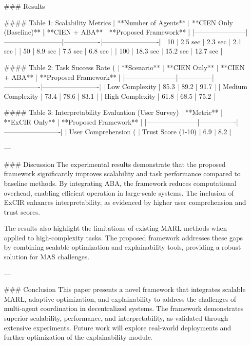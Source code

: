 ### Results  

#### Table 1: Scalability Metrics  
| **Number of Agents** | **CIEN Only (Baseline)** | **CIEN + ABA** | **Proposed Framework** |  
|-----------------------|--------------------------|----------------|-------------------------|  
| 10                   | 2.5 sec                 | 2.3 sec        | 2.1 sec                |  
| 50                   | 8.9 sec                 | 7.5 sec        | 6.8 sec                |  
| 100                  | 18.3 sec                | 15.2 sec       | 12.7 sec               |  

#### Table 2: Task Success Rate (%
| **Scenario**         | **CIEN Only** | **CIEN + ABA** | **Proposed Framework** |  
|-----------------------|---------------|----------------|-------------------------|  
| Low Complexity        | 85.3         | 89.2           | 91.7                   |  
| Medium Complexity     | 73.4         | 78.6           | 83.1                   |  
| High Complexity       | 61.8         | 68.5           | 75.2                   |  

#### Table 3: Interpretability Evaluation (User Survey)  
| **Metric**            | **ExCIR Only** | **Proposed Framework** |  
|-----------------------|----------------|-------------------------|  
| User Comprehension (%
| Trust Score (1-10)    | 6.9            | 8.2                    |  

---

### Discussion  
The experimental results demonstrate that the proposed framework significantly improves scalability and task performance compared to baseline methods. By integrating ABA, the framework reduces computational overhead, enabling efficient operation in large-scale systems. The inclusion of ExCIR enhances interpretability, as evidenced by higher user comprehension and trust scores.

The results also highlight the limitations of existing MARL methods when applied to high-complexity tasks. The proposed framework addresses these gaps by combining scalable optimization and explainability tools, providing a robust solution for MAS challenges.

---

### Conclusion  
This paper presents a novel framework that integrates scalable MARL, adaptive optimization, and explainability to address the challenges of multi-agent coordination in decentralized systems. The framework demonstrates superior scalability, performance, and interpretability, as validated through extensive experiments. Future work will explore real-world deployments and further optimization of the explainability module.


